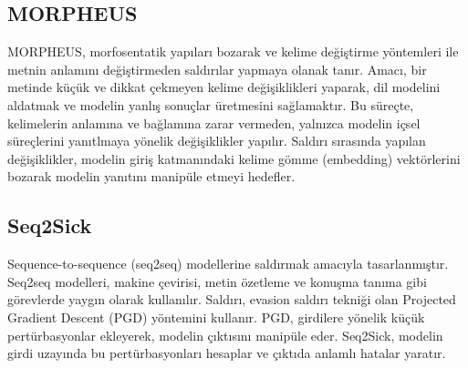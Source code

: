 \newpage

\subsection{MORPHEUS}

MORPHEUS, morfosentatik yapıları bozarak ve kelime değiştirme yöntemleri ile metnin anlamını değiştirmeden saldırılar yapmaya olanak tanır. Amacı, bir metinde küçük ve dikkat çekmeyen kelime değişiklikleri yaparak, dil modelini aldatmak ve modelin yanlış sonuçlar üretmesini sağlamaktır. Bu süreçte, kelimelerin anlamına ve bağlamına zarar vermeden, yalnızca modelin içsel süreçlerini yanıtlmaya yönelik değişiklikler yapılır. Saldırı sırasında yapılan değişiklikler, modelin giriş katmanındaki kelime gömme (embedding) vektörlerini bozarak modelin yanıtını manipüle etmeyi hedefler.

\newpage

\subsection{Seq2Sick}

Sequence-to-sequence (seq2seq) modellerine saldırmak amacıyla tasarlanmıştır. Seq2seq modelleri, makine çevirisi, metin özetleme ve konuşma tanıma gibi görevlerde yaygın olarak kullanılır. Saldırı, evasion saldırı tekniği olan Projected Gradient Descent (PGD) yöntemini kullanır. PGD, girdilere yönelik küçük pertürbasyonlar ekleyerek, modelin çıktısını manipüle eder. Seq2Sick, modelin girdi uzayında bu pertürbasyonları hesaplar ve çıktıda anlamlı hatalar yaratır. 


\newpage